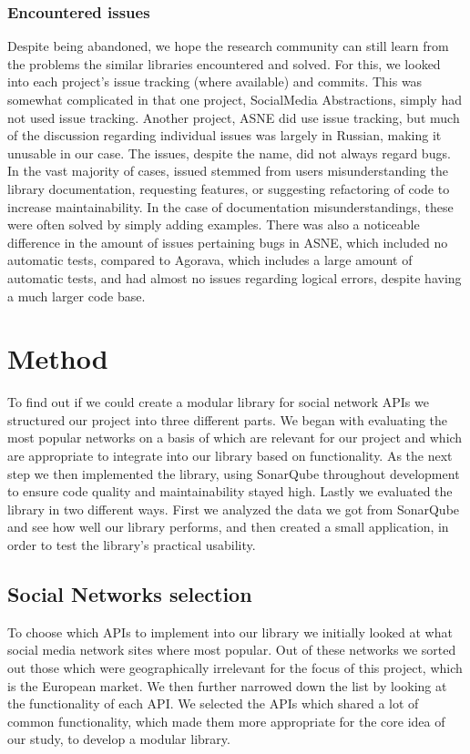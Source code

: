 \documentclass{sigchi-alternate}
\begin{document}
\subsubsection{Encountered issues}
Despite being abandoned, we hope the research community can still learn from the problems the similar libraries encountered and solved. For this, we looked into each project's issue
tracking (where available) and commits. This was somewhat complicated in that one project, SocialMedia Abstractions, simply had not used issue tracking. 
Another project, ASNE did use issue tracking, but much of the discussion regarding individual issues was largely in Russian, making it unusable in our case. 
The issues, despite the name, did not always regard bugs. In the vast majority of cases, issued stemmed from users misunderstanding the library documentation,
requesting features, or suggesting refactoring of code to increase maintainability. In the case of documentation misunderstandings, these were often
solved by simply adding examples. There was also a noticeable difference in the amount of issues pertaining bugs in ASNE, which included no automatic tests,
compared to Agorava, which includes a large amount of automatic tests, and had almost no issues regarding logical errors, despite having a much larger code base.

\section{Method}
To find out if we could create a modular library for social network APIs we structured our project into three different parts. We began with evaluating the most 
popular networks on a basis of which are relevant for our project and which are appropriate to integrate into our library based on functionality. As the next step we then implemented
the library, using SonarQube throughout development to ensure code quality and maintainability stayed high. Lastly we evaluated the library in two different ways.
First we analyzed the data we got from SonarQube and see how well our library performs, and then created a small application, in order to test the library's practical usability.

\subsection{Social Networks selection}
To choose which APIs to implement into our library we initially looked at what social media network sites where most popular\autocite{STATISTA_LEADING_SOCIAL_NETWORKS}.
Out of these networks we sorted out those which were geographically irrelevant for the focus of this project, which is the European market. We then further narrowed down
the list by looking at the functionality of each API. We selected the APIs which shared a lot of common functionality, which made them more appropriate for the core idea
of our study, to develop a modular library.
\end{document}
